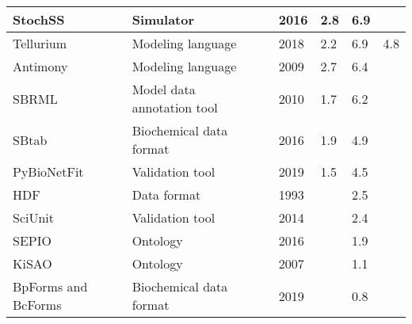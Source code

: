 \begin{longtable}{L{2.2cm}L{4cm}L{1cm}L{0.8cm}R{1.1cm}R{1cm}R{1cm}}
\midrule
\small{StochSS} &\small{Simulator} &\cite{drawert2016stochastic} &\small{2016} &\small{2.8} &\small{6.9} &\small{}\\
\midrule
\small{Tellurium} &\small{Modeling language} &\cite{Choi2018Tellurium:Biology} &\small{2018} &\small{2.2} &\small{6.9} &\small{4.8}\\
\midrule
\small{Antimony} &\small{Modeling language} &\cite{Smith2009Antimony:Language} &\small{2009} &\small{2.7} &\small{6.4} &\small{}\\
\midrule
\small{SBRML} &\small{Model data annotation tool} &\cite{Dada2010SBRML:Models} &\small{2010} &\small{1.7} &\small{6.2} &\small{}\\
\midrule
\small{SBtab} &\small{Biochemical data format} &\cite{Lubitz2016SBtab:Biology} &\small{2016} &\small{1.9} &\small{4.9} &\small{}\\
\midrule
\small{PyBioNetFit} &\small{Validation tool} &\cite{Mitra2019PyBioNetFitLanguage} &\small{2019} &\small{1.5} &\small{4.5} &\small{}\\
\midrule
\small{HDF} &\small{Data format} &\cite{Brown1993SoftwareManagement} &\small{1993} &\small{} &\small{2.5} &\small{}\\
\midrule
\small{SciUnit} &\small{Validation tool} &\cite{Omar2014CollaborativeValidation} &\small{2014} &\small{} &\small{2.4} &\small{}\\
\midrule
\small{SEPIO} &\small{Ontology} &\cite{Brush2016SEPIO:Evidence} &\small{2016} &\small{} &\small{1.9} &\small{}\\
\midrule
\small{KiSAO} &\small{Ontology} &\cite{Zhukova2011KineticOntology} &\small{2007} &\small{} &\small{1.1} &\small{}\\
\midrule
\small{BpForms and BcForms} &\small{Biochemical data format} &\cite{Lang2019BpForms:Proteins} &\small{2019} &\small{} &\small{0.8} &\small{}\\
\bottomrule\end{longtable}
